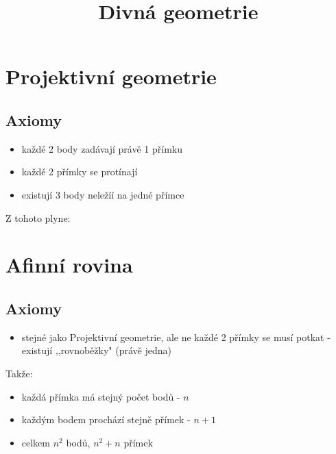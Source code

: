 \documentclass{article}
\title{\vspace{-2cm}Divná geometrie\vspace{-1.7cm}}
\date{}
\author{}
\begin{document}
\maketitle

\section{Projektivní geometrie}

\subsection{Axiomy}
\begin{itemize}
  \item každé 2 body zadávají právě 1 přímku
  \item každé 2 přímky se protínají
  \item existují 3 body neležíí na jedné přímce
\end{itemize}
Z tohoto plyne:

\section{Afinní rovina}
\subsection{Axiomy}
\begin{itemize}
  \item stejné jako Projektivní geometrie, ale ne každé 2 přímky se musí potkat - existují ,,rovnoběžky" (právě jedna)
\end{itemize}
Takže:
\begin{itemize}
  \item každá přímka má stejný počet bodů - $n$
  \item každým bodem prochází stejně přímek - $n+1$
  \item celkem $n^2$ bodů, $n^2+n$ přímek
\end{itemize}
\end{document}
